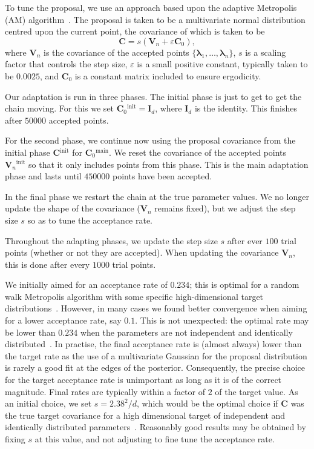 \documentclass[useAMS,usedcolumn,usegraphicx,usenatbib]{mn2e}
\newcommand{\super}[1]{\ensuremath{^\mathrm{#1}}}
\begin{document}
To tune the proposal, we use an approach based upon the adaptive Metropolis (AM) algorithm~\citep{Haario2001}. The proposal is taken to be a multivariate normal distribution centred upon the current point, the covariance of which is taken to be
\begin{equation}
\boldsymbol{C} = s \left(\boldsymbol{V}_n + \varepsilon\boldsymbol{C}_0\right),
\end{equation}
where $\boldsymbol{V}_n$ is the covariance of the accepted points $\{\boldsymbol{\lambda}_1,\ldots,\boldsymbol{\lambda}_n\}$, $s$ is a scaling factor that controls the step size, $\varepsilon$ is a small positive constant, typically taken to be $0.0025$, and $\boldsymbol{C}_0$ is a constant matrix included to ensure ergodicity.

Our adaptation is run in three phases. The initial phase is just to get to get the chain moving. For this we set $\boldsymbol{C}_0\super{init} = \boldsymbol{I}_d$, where $\boldsymbol{I}_d$ is the identity. This finishes after $50000$ accepted points.

For the second phase, we continue now using the proposal covariance from the initial phase $\boldsymbol{C}\super{init}$ for $\boldsymbol{C}_0\super{main}$. We reset the covariance of the accepted points $\boldsymbol{V}_n\super{init}$ so that it only includes points from this phase. This is the main adaptation phase and lasts until $450000$ points have been accepted.

In the final phase we restart the chain at the true parameter values. We no longer update the shape of the covariance ($\boldsymbol{V}_n$ remains fixed), but we adjust the step size $s$ so as to tune the acceptance rate.

Throughout the adapting phases, we update the step size $s$ after ever $100$ trial points (whether or not they are accepted). When updating the covariance $\boldsymbol{V}_n$, this is done after every $1000$ trial points.

We initially aimed for an acceptance rate of $0.234$; this is optimal for a random walk Metropolis algorithm with some specific high-dimensional target distributions~\citep{Gelman1996,Roberts1997,Roberts2001,Bedard2007}. However, in many cases we found better convergence when aiming for a lower acceptance rate, say $0.1$. This is not unexpected: the optimal rate may be lower than $0.234$ when the parameters are not independent and identically distributed~\citep{Bedard2007,Bedard2008,Bedard2008a}. In practise, the final acceptance rate is (almost always) lower than the target rate as the use of a multivariate Gaussian for the proposal distribution is rarely a good fit at the edges of the posterior. Consequently, the precise choice for the target acceptance rate is unimportant as long as it is of the correct magnitude. Final rates are typically within a factor of $2$ of the target value. As an initial choice, we set $s = 2.38^2/d$, which would be the optimal choice if $\boldsymbol{C}$ was the true target covariance for a high dimensional target of independent and identically distributed parameters~\citep{Gelman1996,Roberts1997,Roberts2001,Haario2001}. Reasonably good results may be obtained by fixing $s$ at this value, and not adjusting to fine tune the acceptance rate.
\end{document}
